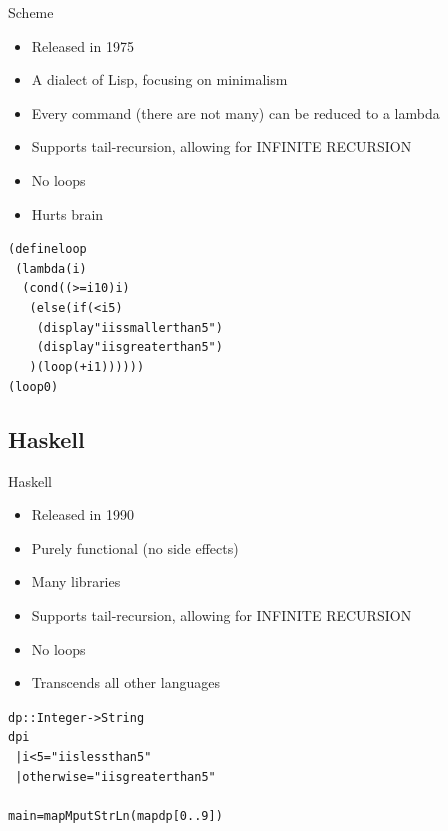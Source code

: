 \documentclass[10pt]{beamer}
\begin{document}
\begin{frame}{Scheme}

	\begin{itemize}
		\item Released in 1975
		\item A dialect of Lisp, focusing on minimalism
		\item Every command (there are not many) can be reduced to a lambda
		\item Supports tail-recursion, allowing for INFINITE RECURSION 
		\item No loops
		\item Hurts brain
	\end{itemize}
	
	\begin{alltt}
	(define loop \\
	~ (lambda (i) \\
		~ ~ (cond ((\textgreater = i 10) i) \\
		~ ~ ~ (else (if (< i 5) \\
		~ ~ ~ ~ (display "i is smaller than 5") \\
		~ ~ ~ ~ (display "i is greater than 5") \\
		~ ~ ~ ) (loop (+ i 1)))))) \\
	(loop 0) \\
	\end{alltt}

\end{frame}

\subsection{Haskell}

\begin{frame}{Haskell}

	\begin{itemize}
		\item Released in 1990
		\item Purely functional (no side effects)
		\item Many libraries
		\item Supports tail-recursion, allowing for INFINITE RECURSION 
		\item No loops
		\item Transcends all other languages
	\end{itemize}
	
	\begin{alltt}
	dp :: Integer -\textgreater String \\
	dp i \\
		~ | i < 5 = "i is less than 5" \\
		~ | otherwise = "i is greater than 5" \\
	                                    \\
	main = mapM putStrLn (map dp [0..9]) \\
	\end{alltt}

\end{frame}
\end{document}

